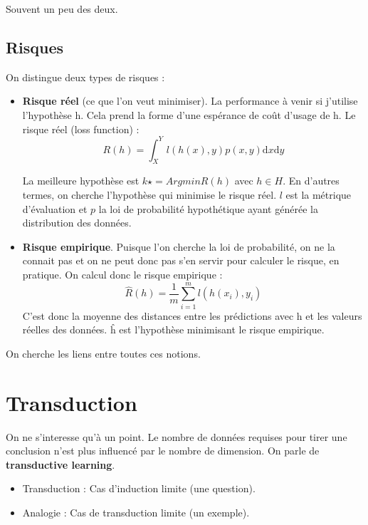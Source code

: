 \documentclass{article}
\begin{document}
Souvent un peu des deux.

\subsection{Risques}

On distingue deux types de risques :

\begin{itemize}
\item \textbf{Risque réel} (ce que l'on veut minimiser). La performance à venir si j'utilise l'hypothèse h. Cela prend la forme d'une espérance de coût d'usage de h. Le risque réel (loss function) : 
\[ R(h) = \displaystyle \int_X^Y l(h(x), y) p(x, y) \mathrm{d}x \mathrm{d}y \]

La meilleure hypothèse est $k\star = Argmin R(h)$ avec $h \in H$. En d'autres termes, on cherche l'hypothèse qui minimise le risque réel. $l$ est la métrique d'évaluation et $p$ la loi de probabilité hypothétique ayant générée la distribution des données.
\item \textbf{Risque empirique}. Puisque l'on cherche la loi de probabilité, on ne la connait pas et on ne peut donc pas s'en servir pour calculer le risque, en pratique. On calcul donc le risque empirique : 
\[ \hat{R}(h) = \frac{1}{m} \sum_{i=1}^m l(h(x_i), y_i) \]
C'est donc la moyenne des distances entre les prédictions avec h et les valeurs réelles des données. \^h est l'hypothèse minimisant le risque empirique. 
\end{itemize}

On cherche les liens entre toutes ces notions.

\section{Transduction}

On ne s'interesse qu'à un point. Le nombre de données requises pour tirer une conclusion n'est plus influencé par le nombre de dimension. On parle de \textbf{transductive learning}.
\begin{itemize}
\item Transduction : Cas d'induction limite (une question).
\item Analogie : Cas de transduction limite (un exemple).
\end{itemize}
\end{document}
